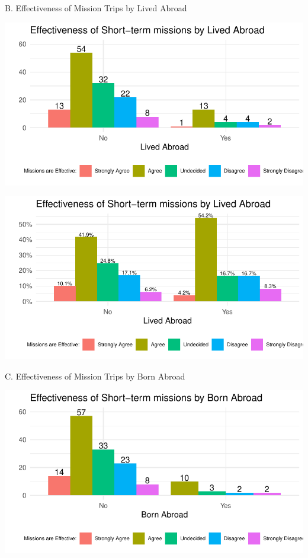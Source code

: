 \documentclass[
  letterpaper,
  DIV=11,
  numbers=noendperiod]{scrartcl}
\begin{document}
\newpage

B. Effectiveness of Mission Trips by Lived Abroad

\includegraphics{GlobalHealthQuarto6-10_files/figure-pdf/unnamed-chunk-12-1.pdf}

\includegraphics{GlobalHealthQuarto6-10_files/figure-pdf/unnamed-chunk-13-1.pdf}

\newpage

C. Effectiveness of Mission Trips by Born Abroad

\includegraphics{GlobalHealthQuarto6-10_files/figure-pdf/unnamed-chunk-14-1.pdf}
\end{document}
